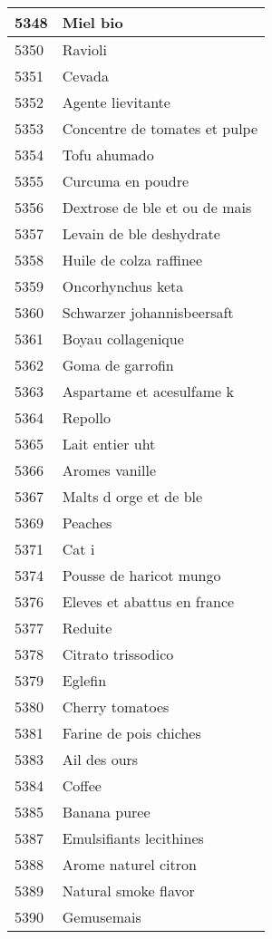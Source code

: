 \begin{longtable}{|l|l|}
5348 & Miel bio \\ \hline 
5350 & Ravioli \\ \hline 
5351 & Cevada \\ \hline 
5352 & Agente lievitante \\ \hline 
5353 & Concentre de tomates et pulpe \\ \hline 
5354 & Tofu ahumado \\ \hline 
5355 & Curcuma en poudre \\ \hline 
5356 & Dextrose de ble et ou de mais \\ \hline 
5357 & Levain de ble deshydrate \\ \hline 
5358 & Huile de colza raffinee \\ \hline 
5359 & Oncorhynchus keta \\ \hline 
5360 & Schwarzer johannisbeersaft \\ \hline 
5361 & Boyau collagenique \\ \hline 
5362 & Goma de garrofin \\ \hline 
5363 & Aspartame et acesulfame k \\ \hline 
5364 & Repollo \\ \hline 
5365 & Lait entier uht \\ \hline 
5366 & Aromes vanille \\ \hline 
5367 & Malts d orge et de ble \\ \hline 
5369 & Peaches \\ \hline 
5371 & Cat i \\ \hline 
5374 & Pousse de haricot mungo \\ \hline 
5376 & Eleves et abattus en france \\ \hline 
5377 & Reduite \\ \hline 
5378 & Citrato trissodico \\ \hline 
5379 & Eglefin \\ \hline 
5380 & Cherry tomatoes \\ \hline 
5381 & Farine de pois chiches \\ \hline 
5383 & Ail des ours \\ \hline 
5384 & Coffee \\ \hline 
5385 & Banana puree \\ \hline 
5387 & Emulsifiants lecithines \\ \hline 
5388 & Arome naturel citron \\ \hline 
5389 & Natural smoke flavor \\ \hline 
5390 & Gemusemais \\ \hline 

\end{longtable}
